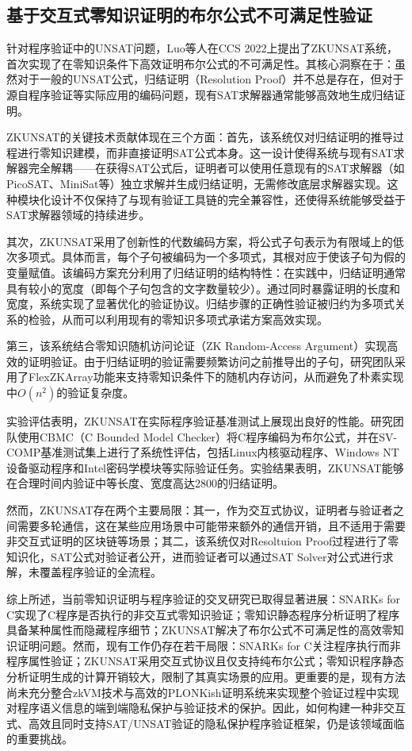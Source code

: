 \subsection{基于交互式零知识证明的布尔公式不可满足性验证}
针对程序验证中的UNSAT问题，Luo等人在CCS 2022上提出了ZKUNSAT系统\cite{10.1145/3548606.3559373}，首次实现了在零知识条件下高效证明布尔公式的不可满足性。其核心洞察在于：虽然对于一般的UNSAT公式，归结证明（Resolution Proof）并不总是存在，但对于源自程序验证等实际应用的编码问题，现有SAT求解器通常能够高效地生成归结证明。

ZKUNSAT的关键技术贡献体现在三个方面：首先，该系统仅对归结证明的推导过程进行零知识建模，而非直接证明SAT公式本身。这一设计使得系统与现有SAT求解器完全解耦——在获得SAT公式后，证明者可以使用任意现有的SAT求解器（如PicoSAT、MiniSat等）独立求解并生成归结证明，无需修改底层求解器实现。这种模块化设计不仅保持了与现有验证工具链的完全兼容性，还使得系统能够受益于SAT求解器领域的持续进步。

其次，ZKUNSAT采用了创新性的代数编码方案，将公式子句表示为有限域上的低次多项式。具体而言，每个子句被编码为一个多项式，其根对应于使该子句为假的变量赋值。该编码方案充分利用了归结证明的结构特性：在实践中，归结证明通常具有较小的宽度（即每个子句包含的文字数量较少）。通过同时暴露证明的长度和宽度，系统实现了显著优化的验证协议。归结步骤的正确性验证被归约为多项式关系的检验，从而可以利用现有的零知识多项式承诺方案高效实现。

第三，该系统结合零知识随机访问论证（ZK Random-Access Argument）实现高效的证明验证。由于归结证明的验证需要频繁访问之前推导出的子句，研究团队采用了FlexZKArray功能来支持零知识条件下的随机内存访问，从而避免了朴素实现中$O(n^2)$的验证复杂度。

实验评估表明，ZKUNSAT在实际程序验证基准测试上展现出良好的性能。研究团队使用CBMC（C Bounded Model Checker）将C程序编码为布尔公式，并在SV-COMP基准测试集上进行了系统性评估，包括Linux内核驱动程序、Windows NT设备驱动程序和Intel密码学模块等实际验证任务。实验结果表明，ZKUNSAT能够在合理时间内验证中等长度、宽度高达2800的归结证明。

然而，ZKUNSAT存在两个主要局限：其一，作为交互式协议，证明者与验证者之间需要多轮通信，这在某些应用场景中可能带来额外的通信开销，且不适用于需要非交互式证明的区块链等场景；其二，该系统仅对Resoltuion Proof过程进行了零知识化，SAT公式对验证者公开，进而验证者可以通过SAT Solver对公式进行求解，未覆盖程序验证的全流程。


综上所述，当前零知识证明与程序验证的交叉研究已取得显著进展：SNARKs for C实现了C程序是否执行的非交互式零知识验证；零知识静态程序分析证明了程序具备某种属性而隐藏程序细节；ZKUNSAT解决了布尔公式不可满足性的高效零知识证明问题。然而，现有工作仍存在若干局限：SNARKs for C关注程序执行而非程序属性验证；ZKUNSAT采用交互式协议且仅支持纯布尔公式\cite{10.1145/3548606.3559373}；零知识程序静态分析证明生成的计算开销较大，限制了其真实场景的应用。更重要的是，现有方法尚未充分整合zkVM技术与高效的PLONKish证明系统来实现整个验证过程中实现对程序语义信息的端到端隐私保护与验证技术的保护。因此，如何构建一种非交互式、高效且同时支持SAT/UNSAT验证的隐私保护程序验证框架，仍是该领域面临的重要挑战。

